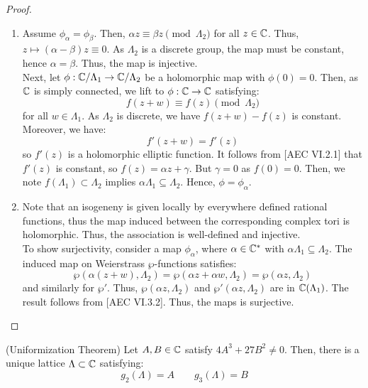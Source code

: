 \documentclass[12pt]{article}
\begin{document}
\begin{proof}
    \bbni
    \begin{enumerate}
        \item Assume $\phi_\alpha = \phi_\beta$. Then, $\alpha z \equiv \beta z \pmod{\Lambda_2}$ for all $z \in \mathbb C$. Thus, $z \mapsto (\alpha-\beta)z \equiv 0$. As $\Lambda_2$ is a discrete group, the map must be constant, hence $\alpha = \beta$. Thus, the map is injective. \\
        Next, let $\phi: \mathbb C/\Lambda_1 \to \mathbb C/\Lambda_2$ be a holomorphic map with $\phi(0) = 0$. Then, as $\mathbb C$ is simply connected, we lift to $\phi:\mathbb C \to \mathbb C$ satisfying: 
        \[ f(z+w) \equiv f(z) \pmod{\Lambda_2} \]
        for all $w \in \Lambda_1$. As $\Lambda_2$ is discrete, we have $f(z+w)-f(z)$ is constant. Moreover, we have:
        \[ f'(z+w) = f'(z)\]
        so $f'(z)$ is a holomorphic elliptic function. It follows from [AEC VI.2.1] that $f'(z)$ is constant, so $f(z) = \alpha z + \gamma$. But $\gamma = 0$ as $f(0) = 0$. Then, we note $f(\Lambda_1) \subset \Lambda_2$ implies $\alpha\Lambda_1 \subseteq \Lambda_2$. Hence, $\phi = \phi_\alpha$.
        \item Note that an isogeneny is given locally by everywhere defined rational functions, thus the map induced between the corresponding complex tori is holomorphic. Thus, the association is well-defined and injective. \\
        To show surjectivity, consider a map $\phi_\alpha$, where $\alpha \in \mathbb C^*$ with $\alpha \Lambda_1 \subseteq \Lambda_2$. The induced map on Weierstrass $\wp$-functions satisfies:
        \[ \wp(\alpha(z+w), \Lambda_2) = \wp(\alpha z + \alpha w, \Lambda_2) = \wp(\alpha z, \Lambda_2)\]
        and similarly for $\wp'$. Thus, $\wp(\alpha z, \Lambda_2)$ and $\wp'(\alpha z, \Lambda_2)$ are in $\mathbb C(\Lambda_1)$. The result follows from [AEC VI.3.2]. Thus, the maps is surjective.
    \end{enumerate}
\end{proof}


\begin{theorem}(Uniformization Theorem)
    Let $A, B \in \mathbb C$ satisfy $4A^3 + 27B^2 \ne 0$. Then, there is a unique lattice $\Lambda \subset \mathbb C$ satisfying:
    \[ g_2(\Lambda) = A \qquad g_3(\Lambda) = B \]

\end{theorem}
\end{document}
